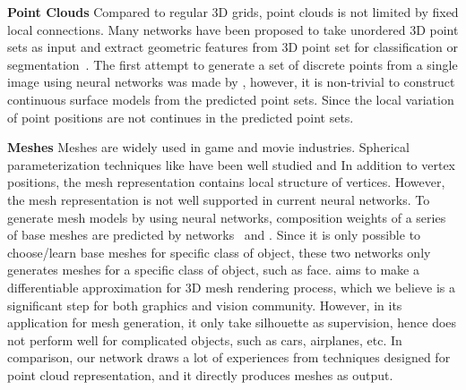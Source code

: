 \noindent\textbf{Point Clouds} 
Compared to regular 3D grids, point clouds is not limited by fixed local connections.
Many networks have been proposed to take unordered 3D point sets as input and extract geometric features from 3D point set for classification or segmentation~\cite{PointNet,NIPS2017_7095,pointcnn}.
%
The first attempt to generate a set of discrete points from a single image using neural networks was made by \cite{PSGN}, however, it is non-trivial to construct continuous surface models from the predicted point sets. Since the local variation of point positions are not continues in the predicted point sets.

%

\noindent\textbf{Meshes}
Meshes are widely used in game and movie industries. Spherical parameterization techniques like \cite{HuAHSP2018} have been well studied and 
In addition to vertex positions, the mesh representation contains local structure of vertices. 
However, the mesh representation is not well supported in current neural networks.
% 
To generate mesh models by using neural networks, composition weights of a series of base meshes are predicted by networks~\cite{img2mesh} and \cite{endface}. %
Since it is only possible to choose/learn base meshes for specific class of object, these two networks only generates meshes for a specific class of object, such as face.
%
\cite{3Drender} aims to make a differentiable approximation for 3D mesh rendering process, which we believe is a significant step for both graphics and vision community. However, in its application for mesh generation, it only take silhouette as supervision, hence does not perform well for complicated objects, such as cars, airplanes, etc.
%
In comparison, our network draws a lot of experiences from techniques designed for point cloud representation, and it directly produces meshes as output.

